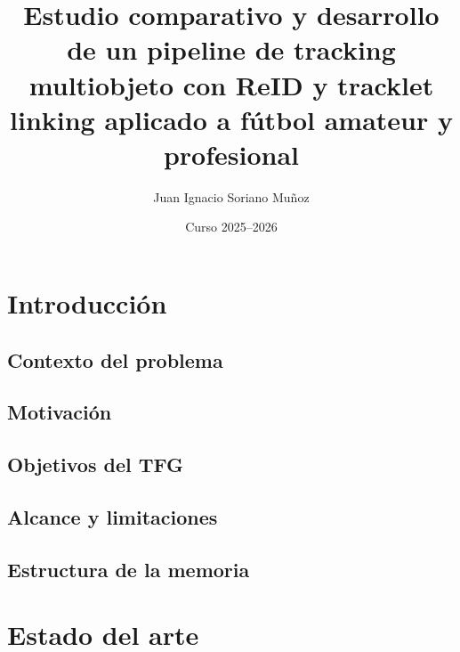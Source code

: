 \documentclass[12pt, a4paper, twoside]{article}
\title{Estudio comparativo y desarrollo de un pipeline de tracking multiobjeto con ReID y tracklet linking aplicado a fútbol amateur y profesional}
\author{Juan Ignacio Soriano Muñoz}
\date{Curso 2025--2026}
\begin{document}
	
	
	
	\clearpage
	\setcounter{page}{1}
	
	
	
	\tableofcontents
	\newpage
	
	
	\section{Introducción}
	
	\subsection{Contexto del problema}
	\subsection{Motivación}
	\subsection{Objetivos del TFG}
	\subsection{Alcance y limitaciones}
	\subsection{Estructura de la memoria}
	
	\newpage
	
	
	\section{Estado del arte}
	
\end{document}
